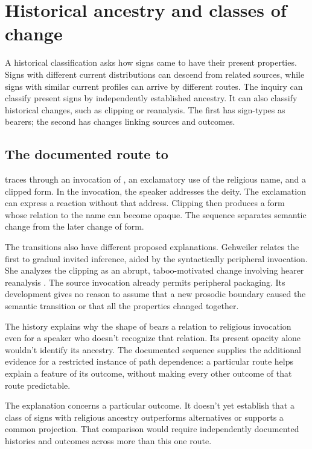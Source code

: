 \documentclass[12pt]{article}
\begin{document}
\section{Historical ancestry and classes of change}\label{sec:history}

A historical classification asks how signs came to have their present
properties. Signs with different current distributions can descend from
related sources, while signs with similar current profiles can arrive by
different routes. The inquiry can classify present signs by independently
established ancestry. It can also classify historical changes, such as
clipping or reanalysis. The first has sign-types as bearers; the second
has changes linking sources and outcomes.

\subsection{The documented route to }

\textcite{gehweiler2008} traces  through an invocation of ,
an exclamatory use of the religious name, and a clipped form. In the invocation, the speaker addresses the deity.
The exclamation can express a reaction without that address. Clipping
then produces a form whose relation to the name can become opaque.
The sequence separates semantic change from the later change of form.

The transitions also have different proposed explanations. Gehweiler
relates the first to gradual invited inference, aided by the syntactically
peripheral invocation. She analyzes the clipping as an abrupt, taboo-motivated
change involving hearer reanalysis \citep[84--88]{gehweiler2008}. The
source invocation already permits peripheral packaging. Its development
gives no reason to assume that a new prosodic boundary caused
the semantic transition or that all the properties changed together.

The history explains why the shape of  bears a relation
to religious invocation even for a speaker who doesn't recognize that
relation. Its present opacity alone wouldn't identify its ancestry.
The documented sequence supplies the additional evidence for a
restricted instance of path dependence: a particular route helps explain
a feature of its outcome, without making every other outcome of that
route predictable.

The explanation concerns a particular outcome. It doesn't yet establish
that a class of signs with religious ancestry outperforms alternatives
or supports a common projection. That comparison would require independently
documented histories and outcomes across more than this one route.
\end{document}
